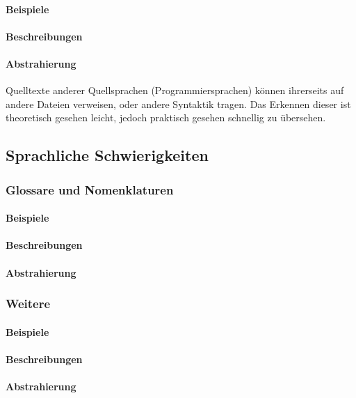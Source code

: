 \paragraph*{Beispiele}
\paragraph*{Beschreibungen}
\paragraph*{Abstrahierung}
Quelltexte anderer Quellsprachen (Programmiersprachen) können ihrerseits auf andere Dateien verweisen, oder andere Syntaktik tragen. Das Erkennen dieser ist theoretisch gesehen leicht, jedoch praktisch gesehen schnellig zu übersehen. 









\subsection{Sprachliche Schwierigkeiten}\label{problems:additional}
\subsubsection{Glossare und Nomenklaturen}
\paragraph*{Beispiele}
\paragraph*{Beschreibungen}
\paragraph*{Abstrahierung}

\subsubsection{Weitere}
\paragraph*{Beispiele}
\paragraph*{Beschreibungen}
\paragraph*{Abstrahierung}
